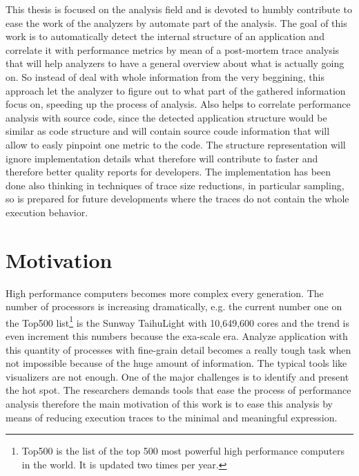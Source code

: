 \documentclass[10pt]{report}
\begin{document}
This thesis is focused on the analysis field and is devoted to humbly contribute 
to ease the work of the analyzers by
automate part of the analysis. The goal of this work is to automatically detect
the internal structure of an application and correlate it with performance metrics by
mean of a post-mortem trace analysis that will help analyzers to have a general
overview about what is actually going on. So instead of deal with whole
information from the very beggining, this approach let the analyzer to figure
out to what part of the gathered information focus on, speeding up the process of
analysis. Also helps to correlate performance analysis with source code, 
since the detected application structure would be similar as
code structure and will contain source coude information that will allow to
easly pinpoint one metric to the code. The structure representation will ignore 
implementation details what therefore will contribute to faster and therefore better 
quality reports for developers. The implementation has been done also thinking 
in techniques of trace size reductions, in particular sampling, so is prepared 
for future developments where the traces do not contain the whole execution behavior.

\section{Motivation}

High performance computers becomes more complex every generation. The number of 
processors is increasing dramatically, e.g. the current number one on the Top500
 list\footnote{Top500 is the list of the top 500 most powerful high performance 
computers in the world. It is updated two times per year.} is the Sunway TaihuLight 
with 10,649,600 cores\cite{top500_2017} and the trend is even increment this
numbers because the exa-scale era. Analyze application with this quantity 
of processes with fine-grain detail becomes a really tough task when not
impossible because of the huge amount of information. The typical tools like 
visualizers are not enough. One of the major challenges is to
identify and present the hot spot. The researchers demands tools that ease the 
process of performance analysis therefore the main motivation of this work is to ease 
this analysis by means of reducing execution traces to the minimal and meaningful 
expression.
\end{document}
